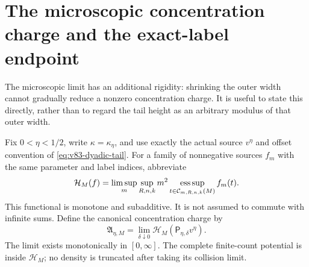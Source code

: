 \section{The microscopic concentration charge and the exact-label endpoint}
\label{sec:v84-concentration}
The microscopic limit has an additional rigidity: shrinking the outer
width cannot gradually reduce a nonzero concentration charge. It is
useful to state this directly, rather than to regard the tail height
as an arbitrary modulus of that outer width.

Fix $0<\eta<1/2$, write $\kappa=\kappa_\eta$, and use exactly the
actual source $v^\eta$ and offset convention of
\eqref{eq:v83-dyadic-tail}. For a family of nonnegative sources $f_m$
with the same parameter and label indices, abbreviate
\[
 \mathcal H_M(f)=\limsup_m\sup_{R,n,k}m^2
                \operatorname*{ess\,sup}_{t\in\mathcal C_{m,R,n,k}(M)}f_m(t).
\]
This functional is monotone and subadditive. It is not assumed to
commute with infinite sums. Define the canonical concentration charge
by
\begin{equation}\label{eq:v84-canonical-charge}
 \mathfrak A_{\eta,M}=\lim_{\delta\downarrow0}
                     \mathcal H_M(\mathsf P_{\eta,\delta}v^\eta).
\end{equation}
The limit exists monotonically in $[0,\infty]$. The complete finite-count
potential is inside $\mathcal H_M$; no density is truncated after
taking its collision limit.

